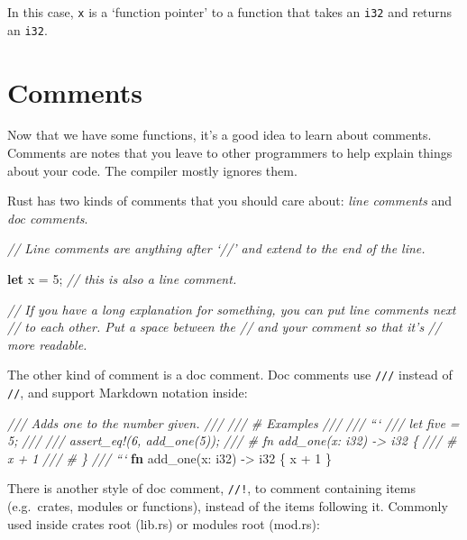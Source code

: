 \documentclass[a4paper,]{book}
\renewcommand*{\hypertarget}[3][\ar]{%
  \def\ar{#2}%
  \label{#1}%
  #3}
\newenvironment{Shaded}{\begin{snugshade}}{\end{snugshade}}
\newcommand{\KeywordTok}[1]{\textcolor[rgb]{0.13,0.29,0.53}{\textbf{{#1}}}}
\newcommand{\DataTypeTok}[1]{\textcolor[rgb]{0.13,0.29,0.53}{{#1}}}
\newcommand{\DecValTok}[1]{\textcolor[rgb]{0.00,0.00,0.81}{{#1}}}
\newcommand{\CommentTok}[1]{\textcolor[rgb]{0.56,0.35,0.01}{\textit{{#1}}}}
\newcommand{\NormalTok}[1]{{#1}}
\begin{document}
In this case, \texttt{x} is a `function pointer' to a function that
takes an \texttt{i32} and returns an \texttt{i32}.

\hypertarget{sec--comments}{\section{Comments}\label{sec--comments}}

Now that we have some functions, it's a good idea to learn about
comments. Comments are notes that you leave to other programmers to help
explain things about your code. The compiler mostly ignores them.

Rust has two kinds of comments that you should care about: \emph{line
comments} and \emph{doc comments}.

\begin{Shaded}
\begin{Highlighting}[]
\CommentTok{// Line comments are anything after ‘//’ and extend to the end of the line.}

\KeywordTok{let} \NormalTok{x = }\DecValTok{5}\NormalTok{; }\CommentTok{// this is also a line comment.}

\CommentTok{// If you have a long explanation for something, you can put line comments next}
\CommentTok{// to each other. Put a space between the // and your comment so that it’s}
\CommentTok{// more readable.}
\end{Highlighting}
\end{Shaded}

The other kind of comment is a doc comment. Doc comments use
\texttt{///} instead of \texttt{//}, and support Markdown notation
inside:

\begin{Shaded}
\begin{Highlighting}[]
\CommentTok{/// Adds one to the number given.}
\CommentTok{///}
\CommentTok{/// # Examples}
\CommentTok{///}
\CommentTok{/// ```}
\CommentTok{/// let five = 5;}
\CommentTok{///}
\CommentTok{/// assert_eq!(6, add_one(5));}
\CommentTok{/// # fn add_one(x: i32) -> i32 \{}
\CommentTok{/// #     x + 1}
\CommentTok{/// # \}}
\CommentTok{/// ```}
\KeywordTok{fn} \NormalTok{add_one(x: }\DataTypeTok{i32}\NormalTok{) -> }\DataTypeTok{i32} \NormalTok{\{}
    \NormalTok{x + }\DecValTok{1}
\NormalTok{\}}
\end{Highlighting}
\end{Shaded}

There is another style of doc comment, \texttt{//!}, to comment
containing items (e.g.~crates, modules or functions), instead of the
items following it. Commonly used inside crates root (lib.rs) or modules
root (mod.rs):
\end{document}
